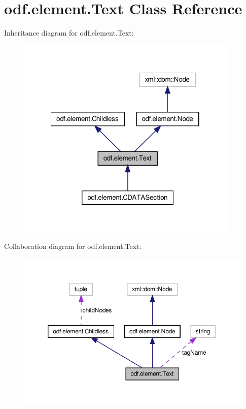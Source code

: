 \hypertarget{classodf_1_1element_1_1Text}{\section{odf.\+element.\+Text Class Reference}
\label{classodf_1_1element_1_1Text}
}


Inheritance diagram for odf.\+element.\+Text\+:
\nopagebreak
\begin{figure}[H]
\begin{center}
\leavevmode
\includegraphics[width=298pt]{classodf_1_1element_1_1Text__inherit__graph}
\end{center}
\end{figure}


Collaboration diagram for odf.\+element.\+Text\+:
\nopagebreak
\begin{figure}[H]
\begin{center}
\leavevmode
\includegraphics[width=350pt]{classodf_1_1element_1_1Text__coll__graph}
\end{center}
\end{figure}
